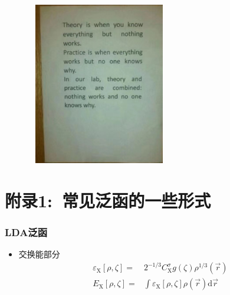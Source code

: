 \documentclass[cjk,slidestop,compress,mathserif,blue]{beamer}
\begin{document}
\frame
{
\begin{figure}[h!]
\vskip -5pt
\centering
\includegraphics[height=2.8in,width=2.5in,viewport=110 225 505 660,clip]{Figures/Theory_Practice.jpg}
\label{Theory_Practice}
\end{figure}
}

\section{附录1:~常见泛函的一些形式}
\frame%
{
	\frametitle{\rm{LDA}泛函}
	\begin{itemize}
		\item 交换能部分
	\begin{displaymath}
		\begin{aligned}
			\varepsilon_{\mathrm{X}}[\rho,\zeta]=&2^{-1/3}C_{\mathrm{X}}^{\sigma}g(\zeta)\rho^{1/3}(\vec r)\\
			E_{\mathrm{X}}[\rho,\zeta]=&\int\varepsilon_{\mathrm{X}}[\rho,\zeta]\rho(\vec r)\mathrm{d}\vec r\\
		\end{aligned}
	\end{displaymath}
	{\fontsize{7.5pt}{6.0pt}}
	\end{itemize}
}
\end{document}
